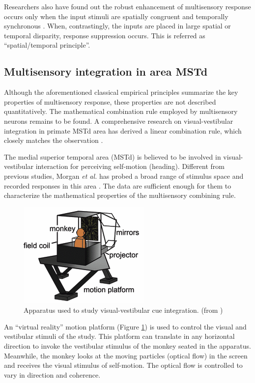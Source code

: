 \documentclass{article}[11pt]
\newcommand{\etal}{\textit{et al. }}
\begin{document}
Researchers also have found out the robust enhancement of multisensory response occurs only when the input stimuli are spatially congruent and temporally synchronous \cite{meredith_determinants_1987, meredith_spatial_1996}. When, contrastingly, the inputs are placed in large spatial or temporal disparity, response suppression occurs. This is referred as ``spatial/temporal principle''.

\subsection{Multisensory integration in area MSTd}
Although the aforementioned classical empirical principles summarize the key properties of multisensory response, these properties are not described quantitatively. The mathematical combination rule employed by multisensory neurons remains to be found. A comprehensive research on visual-vestibular integration in primate MSTd area has derived a linear combination rule, which closely matches the observation \cite{morgan_multisensory_2008}.

The medial superior temporal area (MSTd) is believed to be involved in visual-vestibular interaction for perceiving self-motion (heading). Different from previous studies, Morgan \etal has probed a broad range of stimulus space and recorded responses in this area \cite{morgan_multisensory_2008}. The data are sufficient enough for them to characterize the mathematical properties of the multisensory combining rule.

\begin{figure}[tpb]
  \centering
  \includegraphics[scale=.6]{apparatus}
  \caption{Apparatus used to study visual-vestibular cue integration. (from \cite{fetsch_visualvestibular_2010})}
  \label{fig:apparatus}
\end{figure}

An ``virtual reality'' motion platform (Figure \ref{fig:apparatus}) is used to control the visual and vestibular stimuli of the study. 
This platform can translate in any horizontal direction to invoke the vestibular stimulus of the monkey seated in the apparatus. Meanwhile, the monkey looks at the moving particles (optical flow) in the screen and receives the visual stimulus of self-motion. The optical flow is controlled to vary in direction and coherence.
\end{document}
